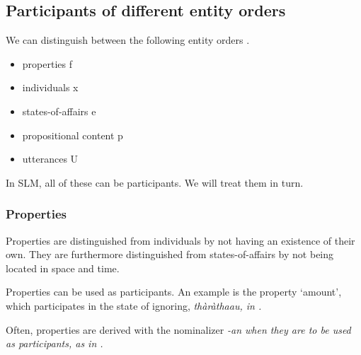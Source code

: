 \subsection{Participants of different entity orders}\label{sec:func:Participantsofdifferententityorders}
We can distinguish between the following entity orders \citep{Lyons1977,Hengeveld1992nvpttd,Hengeveld2004soac,Keizer1992,Dik1997,HengeveldEtAl2008fdg}.

\begin{itemize}
 \item properties f  
 \item individuals x  
 \item states-of-affairs e  
 \item propositional content p  
 \item utterances U  
\end{itemize}

In SLM, all of these can be participants. We will treat them in turn.


\subsubsection{Properties}\label{sec:func:Properties}
Properties are distinguished from individuals by not having an existence of their own. They are furthermore distinguished from states-of-affairs by not being located in space and time.

Properties can be used as participants. An example is the property `amount', which participates in the state of ignoring, \em thàràthaau\em, in .


Often, properties are derived with the nominalizer \em -an \em {} when they are to be used as participants, as in .


